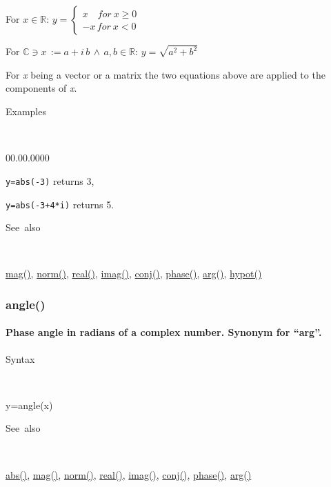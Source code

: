 \medskip{}
For $x\in\mathbb{R}$: $y=\left\{ \begin{array}{l}
x\quad for\: x\geq0\\
-x\, for\: x<0\end{array}\right.$
\medskip{}

For $\mathbb{\mathbb{C}}\ni x\,:=a+i\, b\,\wedge\, a,b\in\mathbb{R}$:
$y=\sqrt{a^{2}+b^{2}}$
\medskip{}

For \textit{x} being a vector or a matrix the two equations above
are applied to the components of \textit{x}.

\begin{description}
\item [Examples]~
\end{description}
\begin{lyxlist}{00.00.0000}
\item [\texttt{y=abs(-3)}]returns 3,
\item [\texttt{y=abs(-3+4{*}i)}]returns 5.
\end{lyxlist}
\begin{description}
\item [See~also]~
\end{description}
\textcolor{blue}{\hyperlink{mag}{mag()}}, \textcolor{blue}{\hyperlink{norm}{norm()}},
\textcolor{blue}{\hyperlink{real}{real()}}, \textcolor{blue}{\hyperlink{imag}{imag()}},
\textcolor{blue}{\hyperlink{conj}{conj()}}, \textcolor{blue}{\hyperlink{phase}{phase()}},
\textcolor{blue}{\hyperlink{arg}{arg()}}, \textcolor{blue}{\hyperlink{hypot}{hypot()}}


\newpage
\subsubsection*{\hypertarget{angle}{}{\Large angle()}}


\paragraph{\label{par:angle}Phase angle in radians of a complex number. Synonym
for {}``arg''.}

\begin{description}
\item [Syntax]~
\end{description}
y=angle(x)

\begin{description}
\item [See~also]~
\end{description}
\textcolor{blue}{\hyperlink{abs}{abs()}}, \textcolor{blue}{\hyperlink{mag}{mag()}},
\textcolor{blue}{\hyperlink{norm}{norm()}}, \textcolor{blue}{\hyperlink{real}{real()}},
\textcolor{blue}{\hyperlink{imag}{imag()}}, \textcolor{blue}{\hyperlink{conj}{conj()}},
\textcolor{blue}{\hyperlink{phase}{phase()}}, \textcolor{blue}{\hyperlink{arg}{arg()}}


